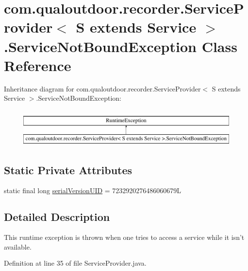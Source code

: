 \hypertarget{classcom_1_1qualoutdoor_1_1recorder_1_1ServiceProvider_3_01S_01extends_01Service_01_4_1_1ServiceNotBoundException}{\section{com.\-qualoutdoor.\-recorder.\-Service\-Provider$<$ S extends Service $>$.Service\-Not\-Bound\-Exception Class Reference}
\label{classcom_1_1qualoutdoor_1_1recorder_1_1ServiceProvider_3_01S_01extends_01Service_01_4_1_1ServiceNotBoundException}
}
Inheritance diagram for com.\-qualoutdoor.\-recorder.\-Service\-Provider$<$ S extends Service $>$.Service\-Not\-Bound\-Exception\-:\begin{figure}[H]
\begin{center}
\leavevmode
\includegraphics[height=2.000000cm]{classcom_1_1qualoutdoor_1_1recorder_1_1ServiceProvider_3_01S_01extends_01Service_01_4_1_1ServiceNotBoundException}
\end{center}
\end{figure}
\subsection*{Static Private Attributes}
\begin{DoxyCompactItemize}
\item 
static final long \hyperlink{classcom_1_1qualoutdoor_1_1recorder_1_1ServiceProvider_3_01S_01extends_01Service_01_4_1_1ServiceNotBoundException_ad767586e42cb0f84138992c17c9f504b}{serial\-Version\-U\-I\-D} = 7232920276486060679\-L
\end{DoxyCompactItemize}


\subsection{Detailed Description}
This runtime exception is thrown when one tries to access a service while it isn't available. 

Definition at line 35 of file Service\-Provider.\-java.



